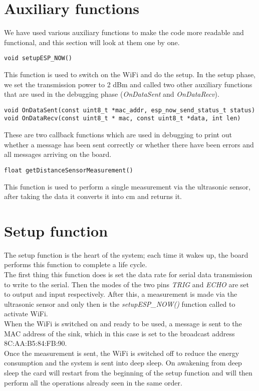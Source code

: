\section{Auxiliary functions}
We have used various auxiliary functions to make the code more readable and functional, and this section will look at them one by one. \\
\begin{verbatim}
void setupESP_NOW()
\end{verbatim}
This function is used to switch on the WiFi and do the setup.
In the setup phase, we set the transmission power to 2 dBm and called two other auxiliary functions that are used in the debugging phase (\textit{OnDataSent} and \textit{OnDataRecv}). \\
\begin{verbatim}
void OnDataSent(const uint8_t *mac_addr, esp_now_send_status_t status)
void OnDataRecv(const uint8_t * mac, const uint8_t *data, int len) 
\end{verbatim}
These are two callback functions which are used in debugging to print out whether a message has been sent correctly or whether there have been errors and all messages arriving on the board. \\
\begin{verbatim}
float getDistanceSensorMeasurement()
\end{verbatim}
This function is used to perform a single measurement via the ultrasonic sensor, after taking the data it converts it into cm and returns it.

\section{Setup function}
The setup function is the heart of the system; each time it wakes up, the board performs this function to complete a life cycle.\\
The first thing this function does is set the data rate for serial data transmission to write to the serial.
Then the modes of the two pins \textit{TRIG} and \textit{ECHO} are set to output and input respectively.
After this, a measurement is made via the ultrasonic sensor and only then is the \textit{setupESP\_NOW()} function called to activate WiFi.\\
When the WiFi is switched on and ready to be used, a message is sent to the MAC address of the sink, which in this case is set to the broadcast address 8C:AA:B5:84:FB:90.\\
Once the measurement is sent, the WiFi is switched off to reduce the energy consumption and the system is sent into deep sleep.
On awakening from deep sleep the card will restart from the beginning of the setup function and will then perform all the operations already seen in the same order.







